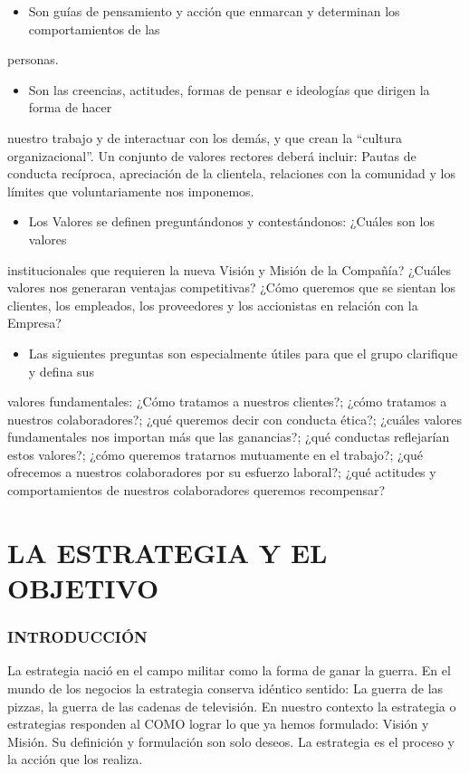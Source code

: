 \begin{itemize}
  \item Son guías de pensamiento y acción que enmarcan y determinan los comportamientos de las
\end{itemize}
personas.



\begin{itemize}
  \item Son las creencias, actitudes, formas de pensar e ideologías que dirigen la forma de hacer
\end{itemize}
nuestro trabajo y de interactuar con los demás, y que crean la “cultura organizacional”. Un conjunto de valores rectores deberá incluir: Pautas de conducta recíproca, apreciación de la clientela, relaciones con la comunidad y los límites que voluntariamente nos imponemos.

\begin{itemize}
  \item Los Valores se definen preguntándonos y contestándonos: ¿Cuáles son los valores
\end{itemize}
institucionales que requieren la nueva Visión y Misión de la Compañía? ¿Cuáles valores nos generaran ventajas competitivas? ¿Cómo queremos que se sientan los clientes, los empleados, los proveedores y los accionistas en relación con la Empresa?

\begin{itemize}
  \item Las siguientes preguntas son especialmente útiles para que el grupo clarifique y defina sus
\end{itemize}
valores fundamentales: ¿Cómo tratamos a nuestros clientes?; ¿cómo tratamos a nuestros colaboradores?; ¿qué queremos decir con conducta ética?; ¿cuáles valores fundamentales nos importan más que las ganancias?; ¿qué conductas reflejarían estos valores?; ¿cómo queremos tratarnos mutuamente en el trabajo?; ¿qué ofrecemos a nuestros colaboradores por su esfuerzo laboral?; ¿qué actitudes y comportamientos de nuestros colaboradores queremos recompensar?

\section*{LA ESTRATEGIA Y EL OBJETIVO}
\subsubsection*{INTRODUCCIÓN}
La estrategia nació en el campo militar como la forma de ganar la guerra. En el mundo de los negocios la estrategia conserva idéntico sentido: La guerra de las pizzas, la guerra de las cadenas de televisión. En nuestro contexto la estrategia o estrategias responden al COMO lograr lo que ya hemos formulado: Visión y Misión. Su definición y formulación son solo deseos. La estrategia es el proceso y la acción que los realiza.

